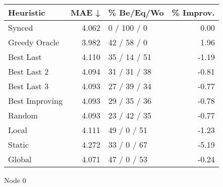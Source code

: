 \begin{tabular}{lrlr}
\toprule
\textbf{Heuristic} & \textbf{MAE ↓} & \textbf{\% Be/Eq/Wo} & \textbf{\% Improv.} \\
\midrule
            Synced &          4.062 &          0 / 100 / 0 &                0.00 \\
     Greedy Oracle &          3.982 &          42 / 58 / 0 &                1.96 \\
         Best Last &          4.110 &         35 / 14 / 51 &               -1.19 \\
       Best Last 2 &          4.094 &         31 / 31 / 38 &               -0.81 \\
       Best Last 3 &          4.093 &         27 / 39 / 34 &               -0.77 \\
    Best Improving &          4.093 &         29 / 35 / 36 &               -0.78 \\
            Random &          4.093 &         23 / 42 / 35 &               -0.77 \\
             Local &          4.111 &          49 / 0 / 51 &               -1.23 \\
            Static &          4.272 &          33 / 0 / 67 &               -5.19 \\
            Global &          4.071 &          47 / 0 / 53 &               -0.24 \\
\bottomrule
\end{tabular}
\caption{Node 0}
\label{tab:hr_non_lr05_le1_bs4_0}
